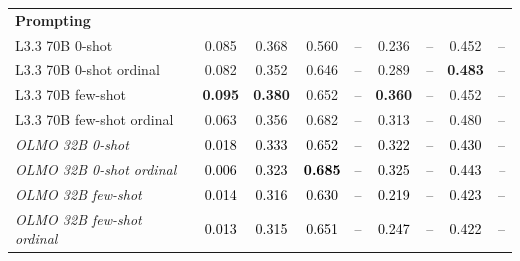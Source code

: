 \begin{table}[htbp]
\begin{ChSevenFloatBody}
{\begin{tabular}{lcccccccc}
\textbf{Prompting} &&&&&&&&\\
L3.3 70B 0-shot & 0.085 & 0.368 & 0.560 & -- & 0.236 & -- & 0.452 & -- \\
L3.3 70B 0-shot ordinal & 0.082 & 0.352 & 0.646 & -- & 0.289 & -- & \textbf{0.483} & -- \\
L3.3 70B few-shot & \textbf{0.095} & \textbf{0.380} & 0.652 & -- & \textbf{0.360} & -- & 0.452 & -- \\
L3.3 70B few-shot ordinal & 0.063 & 0.356 & 0.682 & -- & 0.313 & -- & 0.480 & -- \\
\textit{OLMO 32B 0-shot} & \textcolor{black}{0.018} & \textcolor{black}{0.333} & \textcolor{black}{0.652} & \textcolor{black}{--} & \textcolor{black}{0.322} & \textcolor{black}{--} & \textcolor{black}{0.430} & \textcolor{black}{--} \\
\textit{OLMO 32B 0-shot ordinal} & \textcolor{black}{0.006} & \textcolor{black}{0.323} & \textcolor{black}{\textbf{0.685}} & \textcolor{black}{--} & \textcolor{black}{0.325} & \textcolor{black}{--} & \textcolor{black}{0.443} & \textit{--} \\
\textit{OLMO 32B few-shot} & \textcolor{black}{0.014} & \textcolor{black}{0.316} & \textcolor{black}{0.630} & \textcolor{black}{--} & \textcolor{black}{0.219} & \textcolor{black}{--} & \textcolor{black}{0.423} & \textcolor{black}{--} \\
\textit{OLMO 32B few-shot ordinal} & \textcolor{black}{0.013} & \textcolor{black}{0.315} & \textcolor{black}{0.651} & \textcolor{black}{--} & \textcolor{black}{0.247} & \textcolor{black}{--} & \textcolor{black}{0.422} & \textcolor{black}{--} \\


\end{tabular}}
\end{ChSevenFloatBody}
\end{table}
